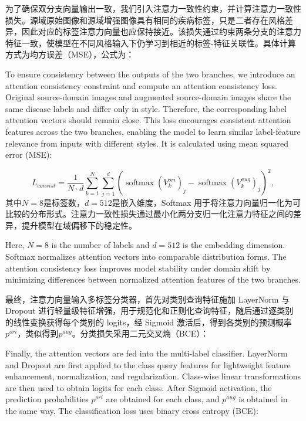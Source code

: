 为了确保双分支向量输出一致，我们引入注意力一致性约束，并计算注意力一致性损失。源域原始图像和源域增强图像具有相同的疾病标签，只是二者存在风格差异，因此对应的标签注意力向量也应保持接近。该损失通过约束两条分支的注意力特征一致，使模型在不同风格输入下仍学习到相近的标签-特征关联性。具体计算方式为均方误差（MSE），公式为：

To ensure consistency between the outputs of the two branches, we introduce an attention consistency constraint and compute an attention consistency loss. Original source-domain images and augmented source-domain images share the same disease labels and differ only in style. Therefore, the corresponding label attention vectors should remain close. This loss encourages consistent attention features across the two branches, enabling the model to learn similar label-feature relevance from inputs with different styles. It is calculated using mean squared error (MSE):

\begin{equation}\label{eq:consistency-loss}
L_{consist} = \frac{1}{N \cdot d}\sum_{k = 1}^{N}\sum_{j = 1}^{d}
\left(
\operatorname{softmax}\left( V_{k}^{ori} \right)_{j}
-
\operatorname{softmax}\left( V_{k}^{aug} \right)_{j}
\right)^{2},
\end{equation}
其中\(N = 8\)是标签数，\(d = 512\)是嵌入维度，Softmax 用于将注意力向量归一化为可比较的分布形式。注意力一致性损失通过最小化两分支归一化注意力特征之间的差异，提升模型在域偏移下的稳定性。

Here, \(N = 8\) is the number of labels and \(d = 512\) is the embedding dimension. Softmax normalizes attention vectors into comparable distribution forms. The attention consistency loss improves model stability under domain shift by minimizing differences between normalized attention features of the two branches.

最终，注意力向量输入多标签分类器，首先对类别查询特征施加 LayerNorm 与 Dropout 进行轻量级特征增强，用于规范化和正则化查询特征，随后通过逐类别的线性变换获得每个类别的 logits，经 Sigmoid 激活后，得到各类别的预测概率\(p^{ori}\)，类似得到\(p^{aug}\)。分类损失采用二元交叉熵（BCE）：

Finally, the attention vectors are fed into the multi-label classifier. LayerNorm and Dropout are first applied to the class query features for lightweight feature enhancement, normalization, and regularization. Class-wise linear transformations are then used to obtain logits for each class. After Sigmoid activation, the prediction probabilities \(p^{ori}\) are obtained for each class, and \(p^{aug}\) is obtained in the same way. The classification loss uses binary cross entropy (BCE):

